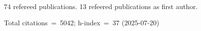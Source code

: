 74 refereed publications. 13 refeered publications as first author.

Total citations~=~5042; h-index~=~37 (2025-07-20)